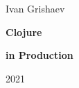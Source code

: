 \begin{titlepage}

\begin{center}

  {Ivan Grishaev}

  \vspace*{5cm}

  {\Huge\textbf{Clojure}}

  \vspace{1mm}

  {\Large\textbf{in Production}}

  \vspace*{\fill}

  {2021}

\end{center}

\end{titlepage}
